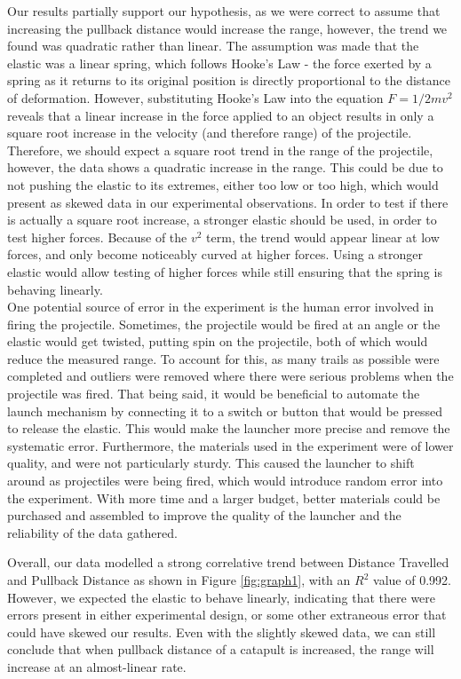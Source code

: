 Our results partially support our hypothesis, as we were correct to assume that increasing the pullback distance would increase the range, however, the trend we found was quadratic rather than linear. The assumption was made that the elastic was a linear spring, which follows Hooke's Law - the force exerted by a spring as it returns to its original position is directly proportional to the distance of deformation. However, substituting Hooke’s Law into the equation 
$F=1/2mv^2$ reveals that a linear increase in the force applied to an object results in only a square root increase in the velocity (and therefore range) of the projectile. Therefore, we should expect a square root trend in the range of the projectile, however, the data shows a quadratic increase in the range. This could be due to not pushing the elastic to its extremes, either too low or too high, which would present as skewed data in our experimental observations. In order to test if there is actually a square root increase, a stronger elastic should be used, in order to test higher forces. Because of the $v^2$ term, the trend would appear linear at low forces, and only become noticeably curved at higher forces. Using a stronger elastic would allow testing of higher forces while still ensuring that the spring is behaving linearly. \\

One potential source of error in the experiment is the human error involved in firing the projectile. Sometimes, the projectile would be fired at an angle or the elastic would get twisted, putting spin on the projectile, both of which would reduce the measured range. To account for this, as many trails as possible were completed and outliers were removed where there were serious problems when the projectile was fired. That being said, it would be beneficial to automate the launch mechanism by connecting it to a switch or button that would be pressed to release the elastic. This would make the launcher more precise and remove the systematic error.
Furthermore, the materials used in the experiment were of lower quality, and were not particularly sturdy. This caused the launcher to shift around as projectiles were being fired, which would introduce random error into the experiment. With more time and a larger budget, better materials could be purchased and assembled to improve the quality of the launcher and the reliability of the data gathered.

Overall, our data modelled a strong correlative trend between Distance Travelled and Pullback Distance as shown in Figure \ref{fig:graph1}, with an $R^2$ value of 0.992. However, we expected the elastic to behave linearly, indicating that there were errors present in either experimental design, or some other extraneous error that could have skewed our results. Even with the slightly skewed data, we can still conclude that when pullback distance of a catapult is increased, the range will increase at an almost-linear rate. 

